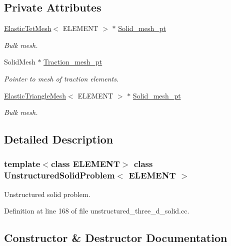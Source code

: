 \subsection*{Private Attributes}
\begin{DoxyCompactItemize}
\item 
\hyperlink{classElasticTetMesh}{Elastic\+Tet\+Mesh}$<$ E\+L\+E\+M\+E\+NT $>$ $\ast$ \hyperlink{classUnstructuredSolidProblem_a09c0a07feb1586f2cca3766b4ac92099}{Solid\+\_\+mesh\+\_\+pt}
\begin{DoxyCompactList}\small\item\em Bulk mesh. \end{DoxyCompactList}\item 
Solid\+Mesh $\ast$ \hyperlink{classUnstructuredSolidProblem_ade114e509464031ba8657600584b9743}{Traction\+\_\+mesh\+\_\+pt}
\begin{DoxyCompactList}\small\item\em Pointer to mesh of traction elements. \end{DoxyCompactList}\item 
\hyperlink{classElasticTriangleMesh}{Elastic\+Triangle\+Mesh}$<$ E\+L\+E\+M\+E\+NT $>$ $\ast$ \hyperlink{classUnstructuredSolidProblem_a2645c5bde2b09a78ae00ef2dcd07411b}{Solid\+\_\+mesh\+\_\+pt}
\begin{DoxyCompactList}\small\item\em Bulk mesh. \end{DoxyCompactList}\end{DoxyCompactItemize}


\subsection{Detailed Description}
\subsubsection*{template$<$class E\+L\+E\+M\+E\+NT$>$\newline
class Unstructured\+Solid\+Problem$<$ E\+L\+E\+M\+E\+N\+T $>$}

Unstructured solid problem. 

Definition at line 168 of file unstructured\+\_\+three\+\_\+d\+\_\+solid.\+cc.



\subsection{Constructor \& Destructor Documentation}
\mbox{\label{classUnstructuredSolidProblem_a18ce02b6e4bbc86403c9e1b32c095772}} 
